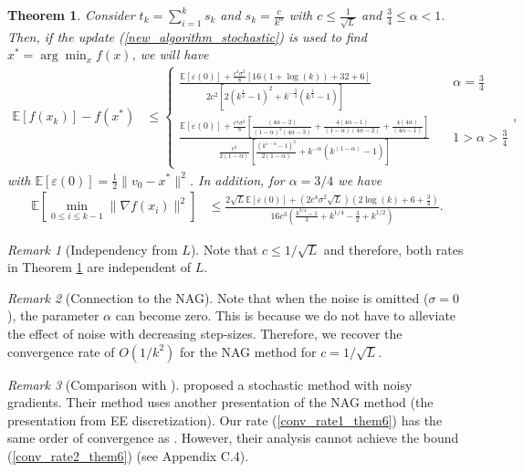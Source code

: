 \documentclass{article}
\theoremstyle{plain}
\newtheorem{theorem}{Theorem}[section]
\theoremstyle{definition}
\theoremstyle{remark}
\newtheorem{remark}{Remark}[theorem]
\begin{document}
\begin{theorem}\label{Theorem5}
    Consider $t_k=\sum_{i=1}^k s_k $ and $s_k=\frac{c}{k^{\alpha}}$ with $c\leq \frac{1}{\sqrt{L}}$ and $\frac{3}{4}\leq\alpha<1$. Then, if the update (\ref{new_algorithm_stochastic}) is used to find $x^*=\arg\min_x f(x)$, we will have
    \begin{align}\label{conv_rate1_them6}
    \mathbb E[f(x_k)]-f(x^*)&\leq \left\{\begin{array}{lr}
         \frac{\mathbb E[\varepsilon (0)]+\frac{c^4\sigma^2}{8}\left[16(1+\log(k))+32+6\right]}{2c^2\left[2(k^{\frac{1}{4}}-1)^2+k^{-\frac{3}{4}}(k^{\frac{1}{4}}-1)\right]} & \quad \alpha=\frac{3}{4} \\
          \frac{\mathbb E[\varepsilon (0)]+\frac{c^4\sigma^2}{8}\left[\frac{(4\alpha -2)}{(1-\alpha)^2(4\alpha-3)}+\frac{4(4\alpha -1)}{(1-\alpha)(4\alpha -2)}+\frac{4(4\alpha )}{(4\alpha -1)}\right]}{\frac{c^2}{2(1-\alpha)}\left[\frac{(k^{1-\alpha}-1)^2}{2(1-\alpha)}+k^{-\alpha}(k^{(1-\alpha)}-1)\right]}& \quad 1>\alpha>\frac{3}{4}
    \end{array}\right.,
\end{align}
with $\mathbb E[\varepsilon (0)]=\frac{1}{2}\|v_0-x^*\|^2$. In addition, for $\alpha = 3/4$ we have
\begin{align}\label{conv_rate2_them6}
    \mathbb E\left[\min_{0\leq i\leq k-1}\|\nabla f(x_i)\|^2 \right] &\leq \frac{2\sqrt{L}\mathbb E[\varepsilon (0)]+(2c^4\sigma^2\sqrt{L})(2\log (k)+6+\frac{3}{4})}{16c^3\left( \frac{k^{3/4}-1}{3} +k^{1/4}-\frac{3}{2}+k^{1/2}\right)}.
\end{align}
\end{theorem}
\begin{remark}[Independency from \(L\)]
Note that $c\leq 1/\sqrt{L}$ and therefore, both rates in Theorem \ref{Theorem5} are independent of $L$. 
\end{remark}
\begin{remark}[Connection to the NAG]
    Note that when the noise is omitted ($\sigma=0$), the parameter $\alpha$ can become zero. This is because we do not have to alleviate the effect of noise with decreasing step-sizes. Therefore, we recover the convergence rate of $O(1/k^2)$ for the NAG method for $c=1/\sqrt{L}$.
\end{remark}
\begin{remark}[Comparison with \citep{pmlr-v108-laborde20a}]
    \citep{pmlr-v108-laborde20a} proposed a stochastic method with noisy gradients. Their method uses another presentation of the NAG method (the presentation from EE discretization). Our rate (\ref{conv_rate1_them6}) has the same order of convergence as \citep{pmlr-v108-laborde20a}. However, their analysis cannot achieve the bound (\ref{conv_rate2_them6}) (see \cite{pmlr-v108-laborde20a} Appendix C.4).
\end{remark}
\end{document}
